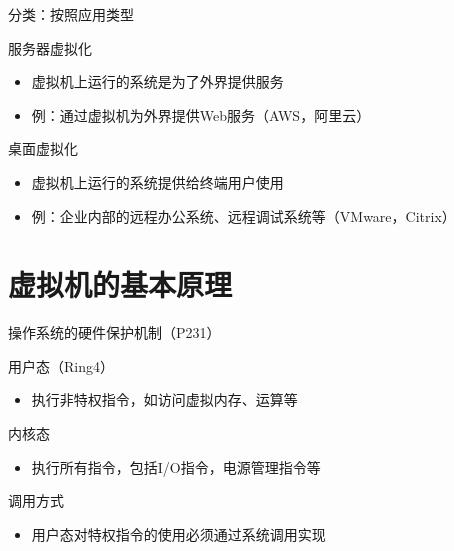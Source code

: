 \begin{frame}{分类：按照应用类型}
    \begin{block}{服务器虚拟化}
   \begin{itemize}
    \item 虚拟机上运行的系统是为了外界提供服务
    \item 例：通过虚拟机为外界提供Web服务（AWS，阿里云）
   \end{itemize}
  \end{block}
    \begin{block}{桌面虚拟化}
       \begin{itemize}
    \item 虚拟机上运行的系统提供给终端用户使用
    \item 例：企业内部的远程办公系统、远程调试系统等（VMware，Citrix）
   \end{itemize}
  \end{block}
\end{frame}
\section{虚拟机的基本原理}
\begin{frame}{操作系统的硬件保护机制（P231）}
    \begin{block}{用户态（Ring4）}
   \begin{itemize}
    \item 执行非特权指令，如访问虚拟内存、运算等
   \end{itemize}
  \end{block}
    \begin{block}{内核态}
       \begin{itemize}
    \item 执行所有指令，包括I/O指令，电源管理指令等
   \end{itemize}
  \end{block}
      \begin{block}{调用方式}
       \begin{itemize}
    \item 用户态对特权指令的使用必须通过系统调用实现
   \end{itemize}
  \end{block}
\end{frame}

